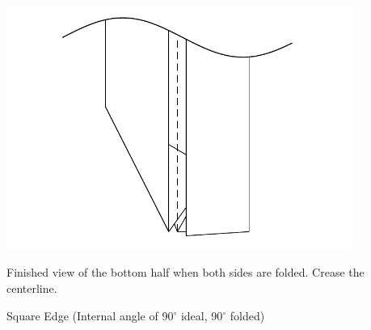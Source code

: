 \documentclass[11pt]{article}
\begin{document}
\begin{minipage}[t]{0.3\textwidth}
  \includegraphics[width=0.85\textwidth]{../figs/fig03-09}
  \begin{itemize}{\item[9.] Finished view of the bottom half when both sides are folded.  Crease the centerline.}\end{itemize}
\end{minipage}

\newpage
{\Large Square Edge}  (Internal angle of 90$^\circ$ ideal, 90$^\circ$ folded)
\vspace*{0.25in}
\end{document}
